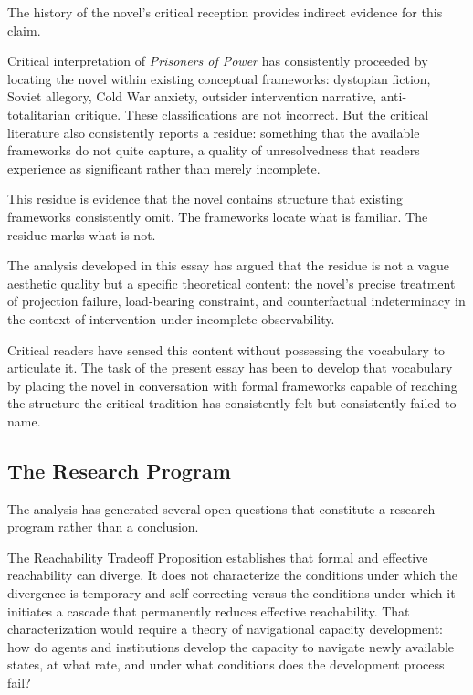 \documentclass[12pt, a4paper]{article}
\theoremstyle{plain}
\theoremstyle{definition}
\theoremstyle{remark}
\begin{document}
The history of the novel's critical reception
provides indirect evidence for this claim.

Critical interpretation of \textit{Prisoners of
Power} has consistently proceeded by locating the
novel within existing conceptual frameworks:
dystopian fiction, Soviet allegory, Cold War
anxiety, outsider intervention narrative,
anti-totalitarian critique. These classifications
are not incorrect. But the critical literature
also consistently reports a residue: something
that the available frameworks do not quite capture,
a quality of unresolvedness that readers experience
as significant rather than merely incomplete.

This residue is evidence that the novel contains
structure that existing frameworks consistently
omit. The frameworks locate what is familiar.
The residue marks what is not.

The analysis developed in this essay has argued
that the residue is not a vague aesthetic quality
but a specific theoretical content: the novel's
precise treatment of projection failure,
load-bearing constraint, and counterfactual
indeterminacy in the context of intervention
under incomplete observability.

Critical readers have sensed this content without
possessing the vocabulary to articulate it. The
task of the present essay has been to develop
that vocabulary by placing the novel in
conversation with formal frameworks capable of
reaching the structure the critical tradition has
consistently felt but consistently failed to name.

\subsection{The Research Program}

The analysis has generated several open questions
that constitute a research program rather than
a conclusion.

The Reachability Tradeoff Proposition establishes
that formal and effective reachability can diverge.
It does not characterize the conditions under
which the divergence is temporary and
self-correcting versus the conditions under which
it initiates a cascade that permanently reduces
effective reachability. That characterization would
require a theory of navigational capacity
development: how do agents and institutions develop
the capacity to navigate newly available states,
at what rate, and under what conditions does the
development process fail?
\end{document}
